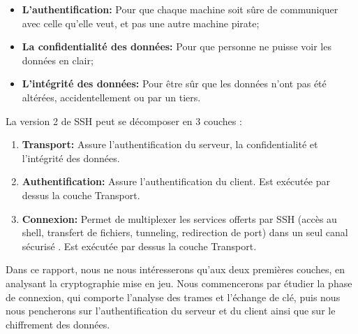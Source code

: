 \begin{itemize}
    \item[\textbullet] {\bfseries L'authentification: }  Pour que chaque machine soit sûre de communiquer avec celle qu'elle veut, et pas une autre machine pirate;
    \item[\textbullet] {\bfseries La confidentialité des données: } Pour que personne ne puisse voir les données en clair;
    \item[\textbullet] {\bfseries L'intégrité des données: } Pour être sûr que les données n'ont pas été altérées, accidentellement ou par un tiers.
\end{itemize}

La version 2 de SSH peut se décomposer en 3 couches \cite{lonvick_secure_2006-1}:
\begin{enumerate}
    \item {\bfseries Transport: } Assure l'authentification du serveur, la confidentialité et l'intégrité des données.
    \item {\bfseries Authentification: } Assure l'authentification du client. Est exécutée par dessus la couche Transport.
    \item {\bfseries Connexion: } Permet de multiplexer les services offerts par SSH (accès au shell, transfert de fichiers, tunneling, redirection de port) dans un seul canal sécurisé \cite{hajjeh_ibrahim_protocole_2006}. Est exécutée par dessus la couche Transport.
\end{enumerate}

Dans ce rapport, nous ne nous intéresserons qu'aux deux premières couches, en analysant la cryptographie mise en jeu. Nous commencerons par étudier la phase de connexion, qui comporte l'analyse des trames et l'échange de clé, puis nous nous pencherons sur l'authentification du serveur et du client ainsi que sur le chiffrement des données.